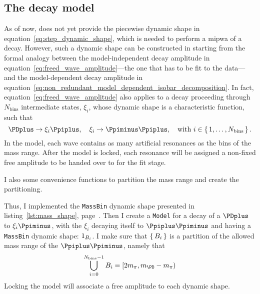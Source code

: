 \subsection{The decay model}

    As of now,  does not yet provide the piecewise dynamic shape in equation~\eqref{eq:step_dynamic_shape}, which is needed to perform a \ac{mipwa} of a decay.
    However, such a dynamic shape can be constructed in  starting from the formal analogy between the model-independent decay amplitude in equation~\eqref{eq:freed_wave_amplitude}---the one that has to be fit to the data---and the model-dependent decay amplitude in equation~\eqref{eq:non_redundant_model_dependent_isobar_decomposition}.
    In fact, equation~\eqref{eq:freed_wave_amplitude} also applies to a decay proceeding through $N_\text{bins}$ intermediate states, $\xi_i$, whose dynamic shape is a characteristic function, such that
    \begin{equation}
        \PDplus\to\xi_i\Ppiplus,\quad%
        \xi_i\to\Ppiminus\Ppiplus,\quad
        \text{with } i \in \set{1,\dots, N_{\text{bins}}}.
    \end{equation}
    In the  model, each wave contains as many artificial resonances as the bins of the mass range.
    After the model is locked, each resonance will be assigned a non-fixed free amplitude to be handed over to  for the fit stage.


    I also some convenience functions to partition the mass range and create the partitioning.


    Thus, I implemented the \lstinline!MassBin! dynamic shape presented in listing~\ref{lst:mass_shape}, page~\pageref{lst:mass_shape}.
    Then I create a \lstinline!Model! for a decay of a $\PDplus$ to $\xi_i\Ppiminus$, with the $\xi_i$ decaying itself to $\Ppiplus\Ppiminus$ and having a \lstinline!MassBin! dynamic shape: $1_{B_i}$.
    I make sure that $\set{B_i}$ is a partition of the allowed mass range of the $\Ppiplus\Ppiminus$, namely that
    \begin{equation}
        \bigcup_{i=0}^{N_\text{bins}-1} B_i = [2m_{\pi},m_{\PD}-m_{\pi})
    \end{equation}
    Locking the model will associate a free amplitude to each dynamic shape.

